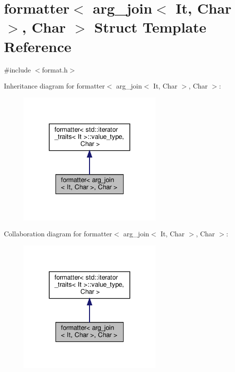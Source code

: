 \hypertarget{structformatter_3_01arg__join_3_01_it_00_01_char_01_4_00_01_char_01_4}{}\section{formatter$<$ arg\+\_\+join$<$ It, Char $>$, Char $>$ Struct Template Reference}
\label{structformatter_3_01arg__join_3_01_it_00_01_char_01_4_00_01_char_01_4}


{\ttfamily \#include $<$format.\+h$>$}



Inheritance diagram for formatter$<$ arg\+\_\+join$<$ It, Char $>$, Char $>$\+:
\nopagebreak
\begin{figure}[H]
\begin{center}
\leavevmode
\includegraphics[width=204pt]{structformatter_3_01arg__join_3_01_it_00_01_char_01_4_00_01_char_01_4__inherit__graph}
\end{center}
\end{figure}


Collaboration diagram for formatter$<$ arg\+\_\+join$<$ It, Char $>$, Char $>$\+:
\nopagebreak
\begin{figure}[H]
\begin{center}
\leavevmode
\includegraphics[width=204pt]{structformatter_3_01arg__join_3_01_it_00_01_char_01_4_00_01_char_01_4__coll__graph}
\end{center}
\end{figure}
